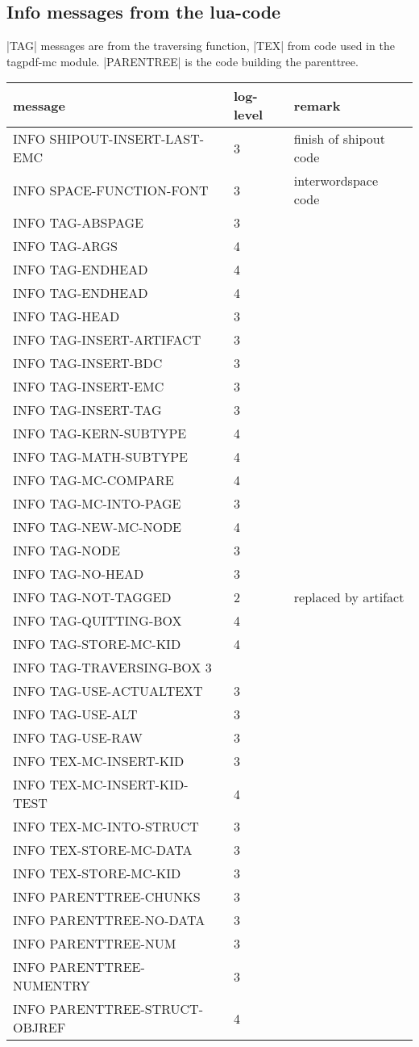 \subsection{Info messages from the lua-code}
|TAG| messages are from the traversing function, |TEX| from code used in the tagpdf-mc module.
|PARENTREE| is the code building the parenttree.
\begin{tabular}{>{\ttfamily}lll}
message & log-level & remark \\\hline
INFO SHIPOUT-INSERT-LAST-EMC & 3 & finish of shipout code \\
INFO SPACE-FUNCTION-FONT     & 3 & interwordspace code \\
INFO TAG-ABSPAGE & 3  \\
INFO TAG-ARGS & 4     \\ 
INFO TAG-ENDHEAD & 4  \\
INFO TAG-ENDHEAD & 4  \\
INFO TAG-HEAD & 3     \\
INFO TAG-INSERT-ARTIFACT & 3  \\
INFO TAG-INSERT-BDC & 3  \\
INFO TAG-INSERT-EMC & 3  \\
INFO TAG-INSERT-TAG & 3  \\
INFO TAG-KERN-SUBTYPE & 4\\
INFO TAG-MATH-SUBTYPE & 4 \\
INFO TAG-MC-COMPARE & 4   \\
INFO TAG-MC-INTO-PAGE & 3 \\
INFO TAG-NEW-MC-NODE & 4  \\
INFO TAG-NODE & 3  \\
INFO TAG-NO-HEAD & 3 \\
INFO TAG-NOT-TAGGED & 2 & replaced by artifact\\
INFO TAG-QUITTING-BOX & 4 \\
INFO TAG-STORE-MC-KID & 4 \\
INFO TAG-TRAVERSING-BOX 3 \\
INFO TAG-USE-ACTUALTEXT & 3 \\
INFO TAG-USE-ALT & 3 \\
INFO TAG-USE-RAW & 3 \\
INFO TEX-MC-INSERT-KID & 3 \\
INFO TEX-MC-INSERT-KID-TEST & 4 \\
INFO TEX-MC-INTO-STRUCT & 3 \\
INFO TEX-STORE-MC-DATA & 3  \\ 
INFO TEX-STORE-MC-KID &  3  \\ 
INFO PARENTTREE-CHUNKS &  3 \\
INFO PARENTTREE-NO-DATA & 3\\
INFO PARENTTREE-NUM & 3 \\
INFO PARENTTREE-NUMENTRY & 3 \\
INFO PARENTTREE-STRUCT-OBJREF & 4 
\end{tabular}






